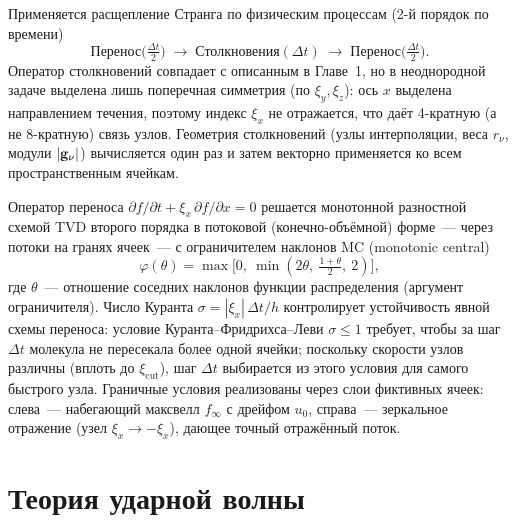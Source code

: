 Применяется расщепление Странга по физическим процессам (2-й порядок по времени)
\begin{equation}
    \text{Перенос}\Big(\tfrac{\Delta t}{2}\Big)\;\to\;
    \text{Столкновения}(\Delta t)\;\to\;
    \text{Перенос}\Big(\tfrac{\Delta t}{2}\Big).
\end{equation}
Оператор столкновений совпадает с описанным в Главе~1, но в неоднородной задаче выделена лишь поперечная симметрия (по
$\xi_y,\xi_z$): ось $x$ выделена направлением течения, поэтому индекс $\xi_x$ не отражается, что даёт 4-кратную (а не
8-кратную) связь узлов.
Геометрия столкновений (узлы интерполяции, веса $r_\nu$, модули $|\mathbf{g}_\nu|$) вычисляется один раз и затем векторно
применяется ко всем пространственным ячейкам.

Оператор переноса $\partial f/\partial t+\xi_x\,\partial f/\partial x=0$ решается монотонной разностной схемой TVD
второго порядка в потоковой (конечно-объёмной) форме~--- через потоки на гранях ячеек~--- с ограничителем наклонов MC
(monotonic central)
\begin{equation}
    \varphi(\theta)=\max\!\big[0,\ \min(2\theta,\ \tfrac{1+\theta}{2},\ 2)\big],
\end{equation}
где $\theta$~--- отношение соседних наклонов функции распределения (аргумент ограничителя).
Число Куранта $\sigma=|\xi_x|\,\Delta t/h$ контролирует устойчивость явной схемы переноса: условие
Куранта--Фридрихса--Леви $\sigma\le1$ требует, чтобы за шаг $\Delta t$ молекула не пересекала более одной ячейки;
поскольку скорости узлов различны (вплоть до $\xi_{\mathrm{cut}}$), шаг $\Delta t$ выбирается из этого условия для
самого быстрого узла.
Граничные условия реализованы через слои фиктивных ячеек: слева~--- набегающий максвелл $f_\infty$ с дрейфом $u_0$,
справа~--- зеркальное отражение (узел $\xi_x\to-\xi_x$), дающее точный отражённый поток.

\section{Теория ударной волны}

